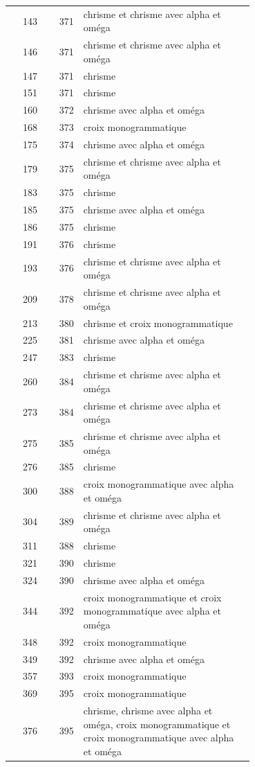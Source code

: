 \begin{longtable}{@{}r r p{0.7\linewidth}@{}}
143 & 371 & chrisme et chrisme avec alpha et oméga \\
146 & 371 & chrisme et chrisme avec alpha et oméga \\
147 & 371 & chrisme \\
151 & 371 & chrisme \\
160 & 372 & chrisme avec alpha et oméga \\
168 & 373 & croix monogrammatique \\
175 & 374 & chrisme avec alpha et oméga \\
179 & 375 & chrisme et chrisme avec alpha et oméga \\
183 & 375 & chrisme \\
185 & 375 & chrisme avec alpha et oméga \\
186 & 375 & chrisme \\
191 & 376 & chrisme \\
193 & 376 & chrisme et chrisme avec alpha et oméga \\
209 & 378 & chrisme et chrisme avec alpha et oméga \\
213 & 380 & chrisme et croix monogrammatique \\
225 & 381 & chrisme avec alpha et oméga \\
247 & 383 & chrisme \\
260 & 384 & chrisme et chrisme avec alpha et oméga \\
273 & 384 & chrisme et chrisme avec alpha et oméga \\
275 & 385 & chrisme et chrisme avec alpha et oméga \\
276 & 385 & chrisme \\
300 & 388 & croix monogrammatique avec alpha et oméga \\
304 & 389 & chrisme et chrisme avec alpha et oméga \\
311 & 388 & chrisme \\
321 & 390 & chrisme \\
324 & 390 & chrisme avec alpha et oméga \\
344 & 392 & croix monogrammatique et croix monogrammatique avec alpha et oméga \\
348 & 392 & croix monogrammatique \\
349 & 392 & chrisme avec alpha et oméga \\
357 & 393 & croix monogrammatique \\
369 & 395 & croix monogrammatique \\
376 & 395 & chrisme, chrisme avec alpha et oméga, croix monogrammatique et croix monogrammatique avec alpha et oméga \\

\end{longtable}
